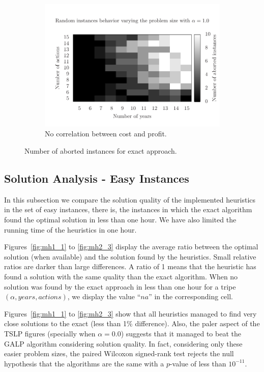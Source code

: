 \begin{figure}[H]
\begin{subfigure}{0.45\textwidth}
    \includegraphics[scale=0.5, trim=0.75cm 0cm 0 2cm, clip=true]{imgs/easy.pdf}
    \caption{No correlation between cost and profit.}
    \label{fig:time3}
  \end{subfigure}
  \caption{Number of aborted instances for exact approach.}
\end{figure}

\subsection{Solution Analysis - Easy Instances}

In this subsection we compare the solution quality of the implemented heuristics
in the set of easy instances, there is, the instances in which the exact algorithm
found the optimal solution in less than one hour. We have also limited the running time
of the heuristics in one hour.

Figures~\ref{fig:mh1_1} to \ref{fig:mh2_3} display the average ratio between the optimal solution (when available) 
and the solution found by the heuristics. 
Small relative ratios are darker than large differences.
A ratio of 1 means that the heuristic has found a solution with the same quality
than the exact algorithm.
When no solution was found by the exact approach in less than one hour for 
a tripe $(\alpha, years, actions)$, we display the value ``$na$'' in
the corresponding cell.

Figures~\ref{fig:mh1_1} to \ref{fig:mh2_3} show that all heuristics managed
to find very close solutions to the exact (less than 1\% difference).
Also, the paler aspect of the TSLP figures (specially when $\alpha=0.0$) suggests that
it managed to beat the GALP algorithm considering solution quality.
In fact, considering only these easier problem sizes, the paired Wilcoxon signed-rank test \cite{japkowicz2011evaluating} rejects the null hypothesis
that the algorithms are the same with a $p$-value of less than $10^{-11}$.

